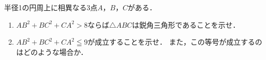 \documentclass[../../main.tex]{subfiles}
\begin{document}
半径1の円周上に相異なる3点$A$，$B$，$C$がある．
\begin{enumerate}
  \item ${AB}^2+{BC}^2+{CA}^2>8$ならば$\triangle ABC$は鋭角三角形であることを示せ．
  \item ${AB}^2+{BC}^2+{CA}^2 \leqq 9$が成立することを示せ．
    また，この等号が成立するのはどのような場合か．
\end{enumerate}
\end{document}
